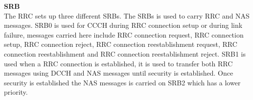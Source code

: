 \begin{table}[H]
\centering
{}
\caption{Signaling comparison between different methods \citep{REL-13}}
\label{tab:signaling_comparison}
\end{table}

\textbf{\Gls{SRB}}\\
The \gls{RRC} sets up three different \gls{SRB}s. The \gls{SRB}s is used to carry \gls{RRC} and \gls{NAS} messages. \gls{SRB}0 is used for \gls{CCCH} during \gls{RRC} connection setup or during link failure, messages carried here include \gls{RRC} connection request, \gls{RRC} connection setup, \gls{RRC} connection reject, \gls{RRC} connection reestablishment request, \gls{RRC} connection reestablishment and \gls{RRC} connection reestablishment reject. \gls{SRB}1 is used when a \gls{RRC} connection is established, it is used to transfer both \gls{RRC} messages using \gls{DCCH} and \gls{NAS} messages until security is established. Once security is established the \gls{NAS} messages is carried on \gls{SRB}2 which has a lower priority. \citep[ch. 6.6]{book_LTE_for_UMTS} 


